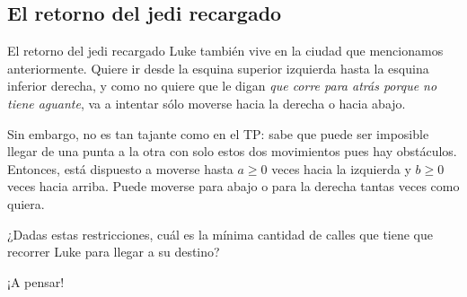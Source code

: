 \documentclass[compress]{beamer}
\begin{document}
\subsection{El retorno del jedi recargado}
\begin{frame}{El retorno del jedi recargado}
Luke también vive en la ciudad que mencionamos anteriormente. Quiere ir desde la esquina superior izquierda hasta la esquina inferior derecha, y como no quiere que le digan \textit{que corre para atrás porque no tiene aguante}, va a intentar sólo moverse hacia la derecha o hacia abajo.\\ \bigskip

Sin embargo, no es tan tajante como en el TP: sabe que puede ser imposible llegar de una punta a la otra con solo estos dos movimientos pues hay obstáculos. Entonces, está dispuesto a moverse hasta $a \geq 0$ veces hacia la izquierda y $b \geq 0$ veces hacia arriba. Puede moverse para abajo o para la derecha tantas veces como quiera.\\ \bigskip

¿Dadas estas restricciones, cuál es la mínima cantidad de calles que tiene que recorrer Luke para llegar a su destino?
\end{frame}

\begin{frame}
\begin{center}
{¡A pensar!}
\end{center}
\end{frame}
\end{document}
